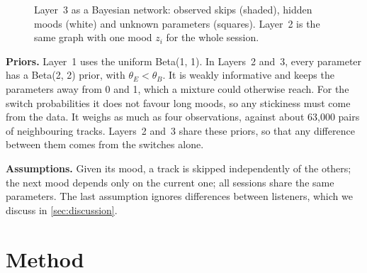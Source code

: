\documentclass[12pt]{article}
\begin{document}
\begin{figure}[h]
\centering
{}
\caption{Layer~3 as a Bayesian network: observed skips (shaded), hidden moods (white) and unknown parameters (squares). Layer~2 is the same graph with one mood $z_i$ for the whole session.}
\label{fig:network}
\end{figure}

\textbf{Priors.} Layer~1 uses the uniform Beta(1, 1). In Layers~2 and~3, every parameter has a Beta(2, 2) prior, with $\theta_E < \theta_B$. It is weakly informative and keeps the parameters away from 0 and 1, which a mixture could otherwise reach. For the switch probabilities it does not favour long moods, so any stickiness must come from the data. It weighs as much as four observations, against about 63{,}000 pairs of neighbouring tracks. Layers~2 and~3 share these priors, so that any difference between them comes from the switches alone.

\textbf{Assumptions.} Given its mood, a track is skipped independently of the others; the next mood depends only on the current one; all sessions share the same parameters. The last assumption ignores differences between listeners, which we discuss in \cref{sec:discussion}. 

\section{Method}\label{sec:method}
\end{document}
